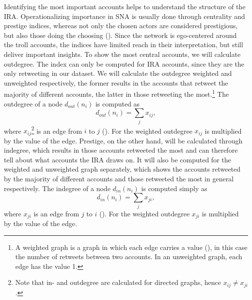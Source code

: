 \documentclass[12pt, titlepage=true, toc=bib]{scrartcl}
\begin{document}
Identifying the most important accounts helps to understand the structure of the IRA. Operationalizing importance in SNA is usually done through centrality and prestige indices, whereas not only the chosen actors are considered prestigious, but also those doing the choosing (\cite[170]{wasserman_social_1994}). Since the network is ego-centered around the troll accounts, the indices have limited reach in their interpretation, but still deliver important insights. To show the most central accounts, we will calculate outdegree. The index can only be computed for IRA accounts, since they are the only retweeting in our dataset. We will calculate the outdegree weighted and unweighted respectively, the former results in the accounts that retweet the majority of different accounts, the latter in those retweeting the most.\footnote{A weighted graph is a graph in which each edge carries a value (\cite[140]{wasserman_social_1994}), in this case the number of retweets between two accounts. In an unweighted graph, each edge has the value 1.} The outdegree of a node \( d_{out}(n_{i}) \) is computed as \[ d_{out}(n_{i}) = \sum_{j} x_{ij} ,\] where \( x_{ij} \)\footnote{Note that in- and outdegree are calculated for directed graphs, hence \( x_{ij} \neq x_{ji} \).} is an edge from \( i \) to \( j \) (\cite[cf.][178]{wasserman_social_1994}). For the weighted outdegree \( x_{ij} \) is multiplied by the value of the edge. Prestige, on the other hand, will be calculated through indegree, which results in those accounts retweeted the most and can therefore tell about what accounts the IRA draws on. It will also be computed for the weighted and unweighted graph separately, which shows the accounts retweeted by the majority of different accounts and those retweeted the most in general respectively. The indegree of a node \( d_{in}(n_{i}) \) is computed simply as \[ d_{in}(n_{i}) = \sum_{j} x_{ji} ,\] where \( x_{ji} \) is an edge from \( j \) to \( i \) (\cite[cf.][202]{wasserman_social_1994}). For the weighted outdegree \( x_{ji} \) is multiplied by the value of the edge.
\end{document}
